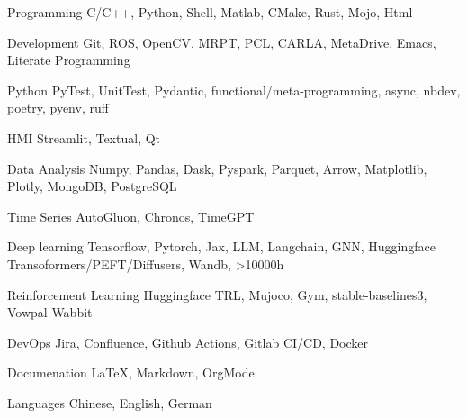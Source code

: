 \documentclass[../cv.tex]{subfiles}
\begin{document}


\begin{cvskills}

  \cvskill
    {Programming} %
    {C/C++, Python, Shell, Matlab, CMake, Rust, Mojo, Html} %

  \cvskill
    {Development} %
    {Git, ROS, OpenCV, MRPT, PCL, CARLA, MetaDrive, Emacs, Literate Programming} %

  \cvskill
    {Python} %
    {PyTest, UnitTest, Pydantic, functional/meta-programming, async, nbdev, poetry, pyenv, ruff} %

  \cvskill
    {HMI} %
    {Streamlit, Textual, Qt} %

  \cvskill
    {Data Analysis} %
    {Numpy, Pandas, Dask, Pyspark, Parquet, Arrow, Matplotlib, Plotly, MongoDB, PostgreSQL} %

  \cvskill
    {Time Series} %
    {AutoGluon, Chronos, TimeGPT} %

  \cvskill
    {Deep learning} %
    {Tensorflow, Pytorch, Jax, LLM, Langchain, GNN, Huggingface Transoformers/PEFT/Diffusers, Wandb, >10000h} %

  \cvskill
    {Reinforcement Learning} %
    {Huggingface TRL, Mujoco, Gym, stable-baselines3, Vowpal Wabbit} %

  \cvskill
    {DevOps} %
    {Jira, Confluence, Github Actions, Gitlab CI/CD, Docker} %

  \cvskill
    {Documenation} %
    {LaTeX, Markdown, OrgMode} %

  \cvskill
    {Languages} %
    {Chinese, English, German} %

\end{cvskills}
\end{document}
